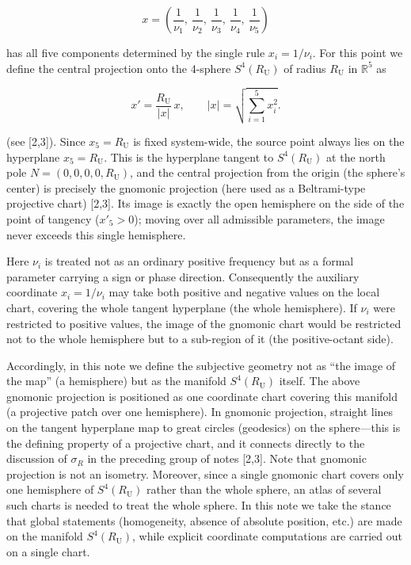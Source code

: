 \documentclass[
]{article}
\begin{document}
\[x=\left(\frac{1}{\nu_1},\ \frac{1}{\nu_2},\ \frac{1}{\nu_3},\ \frac{1}{\nu_4},\ \frac{1}{\nu_5}\right)\]

has all five components determined by the single rule \(x_i=1/\nu_i\).
For this point we define the central projection onto the 4-sphere
\(S^4(R_{\mathrm U})\) of radius \(R_{\mathrm U}\) in \(\mathbb{R}^5\)
as

\[x'=\frac{R_{\mathrm U}}{|x|}\,x,\qquad |x|=\sqrt{\textstyle\sum_{i=1}^{5}x_i^2}.\]

(see {[}2,3{]}). Since \(x_5=R_{\mathrm U}\) is fixed system-wide, the
source point always lies on the hyperplane \(x_5=R_{\mathrm U}\). This
is the hyperplane tangent to \(S^4(R_{\mathrm U})\) at the north pole
\(N=(0,0,0,0,R_{\mathrm U})\), and the central projection from the
origin (the sphere's center) is precisely the gnomonic projection (here
used as a Beltrami-type projective chart) {[}2,3{]}. Its image is
exactly the open hemisphere on the side of the point of tangency
(\(x'_5>0\)); moving over all admissible parameters, the image never
exceeds this single hemisphere.

Here \(\nu_i\) is treated not as an ordinary positive frequency but as a
formal parameter carrying a sign or phase direction. Consequently the
auxiliary coordinate \(x_i=1/\nu_i\) may take both positive and negative
values on the local chart, covering the whole tangent hyperplane (the
whole hemisphere). If \(\nu_i\) were restricted to positive values, the
image of the gnomonic chart would be restricted not to the whole
hemisphere but to a sub-region of it (the positive-octant side).

Accordingly, in this note we define the subjective geometry not as ``the
image of the map'' (a hemisphere) but as the manifold
\(S^4(R_{\mathrm U})\) itself. The above gnomonic projection is
positioned as one coordinate chart covering this manifold (a projective
patch over one hemisphere). In gnomonic projection, straight lines on
the tangent hyperplane map to great circles (geodesics) on the
sphere---this is the defining property of a projective chart, and it
connects directly to the discussion of \(\sigma_R\) in the preceding
group of notes {[}2,3{]}. Note that gnomonic projection is not an
isometry. Moreover, since a single gnomonic chart covers only one
hemisphere of \(S^4(R_{\mathrm U})\) rather than the whole sphere, an
atlas of several such charts is needed to treat the whole sphere. In
this note we take the stance that global statements (homogeneity,
absence of absolute position, etc.) are made on the manifold
\(S^4(R_{\mathrm U})\), while explicit coordinate computations are
carried out on a single chart.
\end{document}

